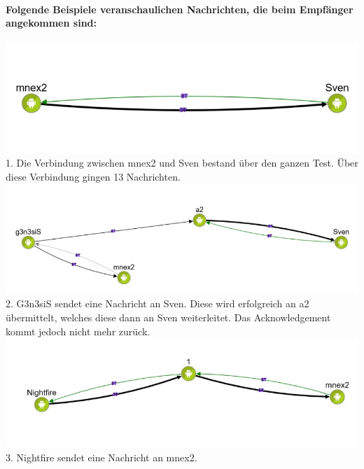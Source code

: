 \paragraph*{Folgende Beispiele veranschaulichen Nachrichten, die beim
Empfänger angekommen sind:}
\includegraphics[width=1.0\textwidth]{belege/grosstests/Bilder/Grosstest2/Test2Erfolg1.jpg}\\
1. Die Verbindung zwischen mnex2 und Sven bestand über den ganzen Test.
Über diese Verbindung gingen 13 Nachrichten.\\
\includegraphics[width=1.0\textwidth]{belege/grosstests/Bilder/Grosstest2/Test2Erfolg3.jpg}\\
2. G3n3siS sendet eine Nachricht an Sven. Diese wird erfolgreich an a2
übermittelt, welches diese dann an Sven weiterleitet. Das
Acknowledgement kommt jedoch nicht mehr zurück.\\
\includegraphics[width=1.0\textwidth]{belege/grosstests/Bilder/Grosstest2/Test2Erfolg4.jpg}\\
3. Nightfire sendet eine Nachricht an mnex2.\\

